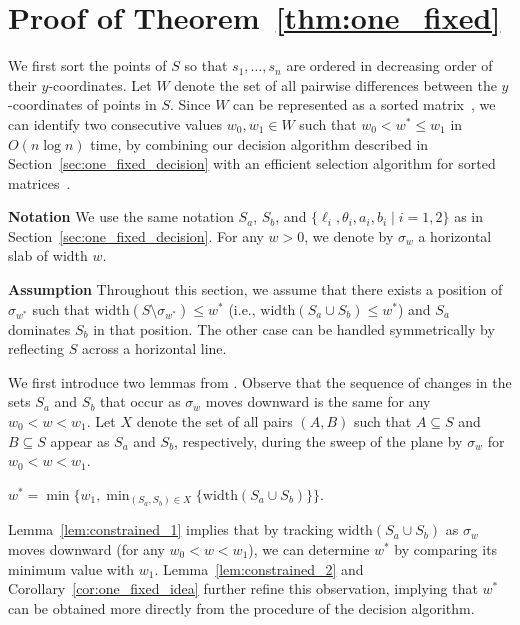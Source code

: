 \documentclass[english,a4paper, cleveref, autoref, thm-restate, nolineno]{socg-lipics-v2021}
\theoremstyle{star}
\theoremstyle{claimstar}
\newcommand{\width}{\ensuremath{\mathrm{width}}}
\begin{document}
\section{Proof of Theorem~\ref{thm:one_fixed}}
\label{sec:one_fixed_appendix}



We first sort the points of $S$ so that $s_1, \ldots, s_n$ are ordered in decreasing order of their $y$-coordinates.
Let $W$ denote the set of all pairwise differences between the $y$-coordinates of points in $S$.
Since $W$ can be represented as a sorted matrix~\cite{frederickson1982complexity}, we can identify two consecutive values $w_0, w_1 \in W$ such that $w_0 < w^* \le w_1$ in $O(n \log n)$ time, by combining our decision algorithm described in Section~\ref{sec:one_fixed_decision} with an efficient selection algorithm for sorted matrices~\cite{frederickson1984generalized}.

\textbf{Notation} We use the same notation $S_a$, $S_b$, and $\{\ell_i, \theta_i, a_i, b_i \mid i = 1, 2\}$ as in Section~\ref{sec:one_fixed_decision}.
For any $w > 0$, we denote by $\sigma_w$ a horizontal slab of width $w$.

\textbf{Assumption}
Throughout this section, we assume that there exists a position of $\sigma_{w^*}$ such that $\width(S \setminus \sigma_{w^*}) \le w^*$  (i.e., $\width(S_a\cup S_b) \le w^*$) and $S_a$ dominates $S_b$ in that position.
The other case can be handled symmetrically by reflecting $S$ across a horizontal line.

We first introduce two lemmas from \cite{ahn2024constrained}.
Observe that the sequence of changes in the sets $S_a$ and $S_b$ that occur as $\sigma_w$ moves downward is the same for any $w_0 < w < w_1$.
Let $X$ denote the set of all pairs $(A, B)$ such that $A \subseteq S$ and $B \subseteq S$ appear as $S_a$ and $S_b$, respectively, during the sweep of the plane by $\sigma_w$ for $w_0 < w < w_1$.


\begin{lemma}
    \label{lem:constrained_1}
    $w^* = \min \{w_1,  \min_{(S_a, S_b) \in X} \{\width(S_a\cup S_b) \}\}$.
\end{lemma}

Lemma~\ref{lem:constrained_1} implies that by tracking $\width(S_a \cup S_b)$ as $\sigma_w$ moves downward (for any $w_0 < w < w_1$), we can determine $w^*$ by comparing its minimum value with $w_1$.
Lemma~\ref{lem:constrained_2} and Corollary~\ref{cor:one_fixed_idea} further refine this observation, implying that $w^*$ can be obtained more directly from the procedure of the decision algorithm.
\end{document}
